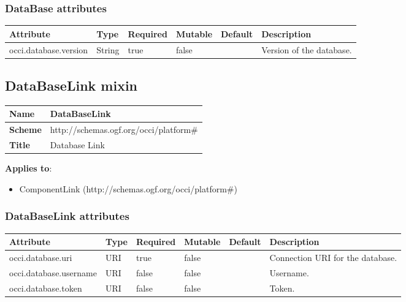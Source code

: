 \documentclass{article}
\begin{document}
\subsubsection{DataBase attributes}
\begin{tabularx}{\textwidth}{|l|l|p{1.4cm}|p{1.3cm}|l|X|}
  \hline
  \textbf{Attribute} & \textbf{Type} & \textbf{Required} & \textbf{Mutable} & \textbf{Default} & \textbf{Description} \\
  \hline  
  occi.database.version & String & true & false &  & Version of the database. \\
  \hline
\end{tabularx}


\subsection{DataBaseLink mixin}
\begin{center}
\begin{tabular}{|l|l|}
  \hline
  \textbf{Name} & DataBaseLink \\
  \hline  
  \textbf{Scheme} & http://schemas.ogf.org/occi/platform\# \\
  \hline
  \textbf{Title} & Database Link \\
  \hline
\end{tabular}
\end{center}
\textbf{Applies to}:
\begin{itemize}
	\item ComponentLink (http://schemas.ogf.org/occi/platform\#)
\end{itemize}

\subsubsection{DataBaseLink attributes}
\begin{tabularx}{\textwidth}{|l|l|p{1.4cm}|p{1.3cm}|l|X|}
  \hline
  \textbf{Attribute} & \textbf{Type} & \textbf{Required} & \textbf{Mutable} & \textbf{Default} & \textbf{Description} \\
  \hline  
  occi.database.uri & URI & true & false &  & Connection URI for the database. \\
  \hline
  occi.database.username & URI & false & false &  & Username. \\
  \hline
  occi.database.token & URI & false & false &  & Token. \\
  \hline
\end{tabularx}
\end{document}
